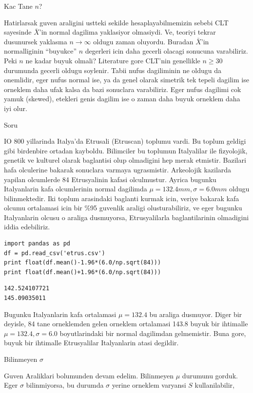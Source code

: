 \documentclass[12pt,fleqn]{article}\usepackage{../common}
\begin{document}
Kac Tane $n$?

Hatirlarsak guven araligini ustteki sekilde hesaplayabilmemizin sebebi CLT
sayesinde $\bar{X}$'in normal dagilima yaklasiyor olmasiydi. Ve, teoriyi
tekrar dusunursek yaklasma $n \to \infty$ oldugu zaman oluyordu. Buradan
$\bar{X}$'in normalliginin ``buyukce'' $n$ degerleri icin daha gecerli
olacagi sonucuna varabiliriz. Peki $n$ ne kadar buyuk olmali?  Literature
gore CLT'nin genellikle $n \ge 30$ durumunda gecerli oldugu soylenir. Tabii
nufus dagiliminin ne oldugu da onemlidir, eger nufus normal ise, ya da
genel olarak simetrik tek tepeli dagilim ise orneklem daha ufak kalsa da
bazi sonuclara varabiliriz. Eger nufus dagilimi cok yamuk (skewed),
etekleri genis dagilim ise o zaman daha buyuk orneklem daha iyi olur.

Soru

IO 800 yillarinda Italya'da Etrusali (Etruscan) toplumu vardi. Bu toplum
geldigi gibi birdenbire ortadan kayboldu. Bilimciler bu toplumun
Italyalilar ile fizyolojik, genetik ve kulturel olarak baglantisi olup
olmadigini hep merak etmistir. Bazilari hafa olculerine bakarak sonuclara
varmaya ugrasmistir. Arkeolojik kazilarda yapilan olcumlerde 84
Etrusyalinin kafasi olculmustur. Ayrica bugunku Italyanlarin kafa
olcumlerinin normal dagilimda $\mu=132.4 mm,\sigma=6.0mm$ oldugu
bilinmektedir. Iki toplum arasindaki baglanti kurmak icin, veriye bakarak
kafa olcumu ortalamasi icin bir \%95 guvenlik araligi olusturabiliriz, ve
eger bugunku Italyanlarin olcusu o araliga dusmuyorsa, Etrusyalilarla
baglantilarinin olmadigini iddia edebiliriz.

\begin{verbatim}
import pandas as pd
df = pd.read_csv('etrus.csv')
print float(df.mean()-1.96*(6.0/np.sqrt(84)))
print float(df.mean()+1.96*(6.0/np.sqrt(84)))
\end{verbatim}

\begin{verbatim}
142.524107721
145.09035011
\end{verbatim}

Bugunku Italyanlarin kafa ortalamasi $\mu=132.4$ bu araliga dusmuyor. Diger
bir deyisle, 84 tane orneklemden gelen orneklem ortalamasi 143.8 buyuk bir
ihtimalle $\mu=132.4,\sigma=6.0$ boyutlarindaki bir normal dagilimdan
gelmemistir. Buna gore, buyuk bir ihtimalle Etrusyalilar Italyanlarin atasi
degildir. 

Bilinmeyen $\sigma$

Guven Araliklari bolumunden devam edelim. Bilinmeyen $\mu$ durumunu
gorduk. Eger $\sigma$ bilinmiyorsa, bu durumda $\sigma$ yerine orneklem
varyansi $S$ kullanilabilir,
\end{document}

